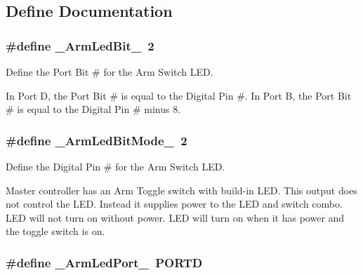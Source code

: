 \subsection{\-Define \-Documentation}
\hypertarget{remotePanel_8ino_abeac387ee946b831a2d5f3ea8efa2cd6}{
\subsubsection[{\-\_\-\-Arm\-Led\-Bit\-\_\-}]{\setlength{\rightskip}{0pt plus 5cm}\#define {\bf \-\_\-\-Arm\-Led\-Bit\-\_\-}~2}}\label{remotePanel_8ino_abeac387ee946b831a2d5f3ea8efa2cd6}


\-Define the \-Port \-Bit \# for the \-Arm \-Switch \-L\-E\-D. 

\-In \-Port \-D, the \-Port \-Bit \# is equal to the \-Digital \-Pin \#. \-In \-Port \-B, the \-Port \-Bit \# is equal to the \-Digital \-Pin \# minus 8. \hypertarget{remotePanel_8ino_a56e638ac4be5080bc22d2b94fb645c7e}{
\subsubsection[{\-\_\-\-Arm\-Led\-Bit\-Mode\-\_\-}]{\setlength{\rightskip}{0pt plus 5cm}\#define {\bf \-\_\-\-Arm\-Led\-Bit\-Mode\-\_\-}~2}}\label{remotePanel_8ino_a56e638ac4be5080bc22d2b94fb645c7e}


\-Define the \-Digital \-Pin \# for the \-Arm \-Switch \-L\-E\-D. 

\-Master controller has an \-Arm \-Toggle switch with build-\/in \-L\-E\-D. \-This output does not control the \-L\-E\-D. \-Instead it supplies power to the \-L\-E\-D and switch combo. \-L\-E\-D will not turn on without power. \-L\-E\-D will turn on when it has power and the toggle switch is on. \hypertarget{remotePanel_8ino_ace3d99afc4b0ef3e41ab1238949d7f07}{
\subsubsection[{\-\_\-\-Arm\-Led\-Port\-\_\-}]{\setlength{\rightskip}{0pt plus 5cm}\#define {\bf \-\_\-\-Arm\-Led\-Port\-\_\-}~\-P\-O\-R\-T\-D}}\label{remotePanel_8ino_ace3d99afc4b0ef3e41ab1238949d7f07}


